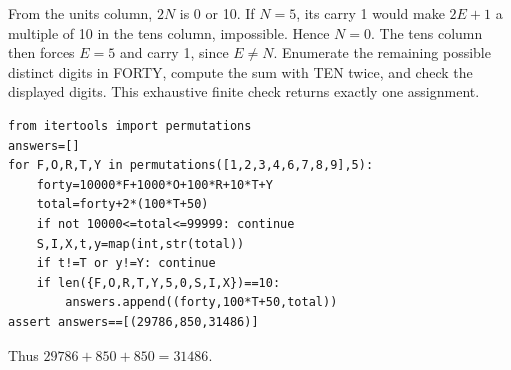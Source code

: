 From the units column, $2N$ is 0 or 10. If $N=5$, its carry 1 would make $2E+1$ a multiple of 10 in the tens column, impossible. Hence $N=0$. The tens column then forces $E=5$ and carry 1, since $E\ne N$. Enumerate the remaining possible distinct digits in FORTY, compute the sum with TEN twice, and check the displayed digits. This exhaustive finite check returns exactly one assignment.
\begin{verbatim}
from itertools import permutations
answers=[]
for F,O,R,T,Y in permutations([1,2,3,4,6,7,8,9],5):
    forty=10000*F+1000*O+100*R+10*T+Y
    total=forty+2*(100*T+50)
    if not 10000<=total<=99999: continue
    S,I,X,t,y=map(int,str(total))
    if t!=T or y!=Y: continue
    if len({F,O,R,T,Y,5,0,S,I,X})==10:
        answers.append((forty,100*T+50,total))
assert answers==[(29786,850,31486)]
\end{verbatim}
Thus $\boxed{29786+850+850=31486}$.
